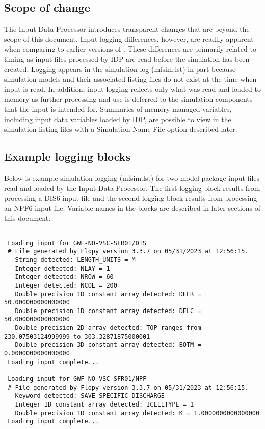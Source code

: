 \subsection{Scope of change}

The Input Data Processor introduces transparent changes that are beyond the scope of this document.  Input logging differences, however, are readily apparent when comparing to earlier versions of \mf.  These differences are primarily related to timing as input files processed by IDP are read before the simulation has been created.  Logging appears in the simulation log (mfsim.lst) in part because simulation models and their associated listing files do not exist at the time when input is read.  In addition, input logging reflects only what was read and loaded to memory as further processing and use is deferred to the simulation components that the input is intended for.  Summaries of memory managed variables, including input data variables loaded by IDP, are possible to view in the simulation listing files with a Simulation Name File option described later. 

\subsection{Example logging blocks}

Below is example simulation logging (mfsim.lst) for two model package input files read and loaded by the Input Data Processor.  The first logging block results from processing a DIS6 input file and the second logging block results from processing an NPF6 input file.  Variable names in the blocks are described in later sections of this document.

\small
\begin{lstlisting}[style=modeloutput]

 Loading input for GWF-NO-VSC-SFR01/DIS
 # File generated by Flopy version 3.3.7 on 05/31/2023 at 12:56:15.
   String detected: LENGTH_UNITS = M
   Integer detected: NLAY = 1
   Integer detected: NROW = 60
   Integer detected: NCOL = 200
   Double precision 1D constant array detected: DELR = 50.000000000000000
   Double precision 1D constant array detected: DELC = 50.000000000000000
   Double precision 2D array detected: TOP ranges from 230.07503124999999 to 303.32871875000001
   Double precision 3D constant array detected: BOTM = 0.0000000000000000
 Loading input complete...

 Loading input for GWF-NO-VSC-SFR01/NPF
 # File generated by Flopy version 3.3.7 on 05/31/2023 at 12:56:15.
   Keyword detected: SAVE_SPECIFIC_DISCHARGE
   Integer 1D constant array detected: ICELLTYPE = 1
   Double precision 1D constant array detected: K = 1.0000000000000000
 Loading input complete...
\end{lstlisting}
